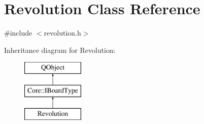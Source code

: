 \hypertarget{class_revolution}{\section{Revolution Class Reference}
\label{class_revolution}
}


{\ttfamily \#include $<$revolution.\-h$>$}

Inheritance diagram for Revolution\-:\begin{figure}[H]
\begin{center}
\leavevmode
\includegraphics[height=3.000000cm]{class_revolution}
\end{center}
\end{figure}
